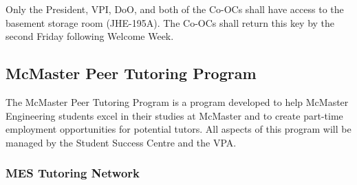 Only the President, VPI, DoO, and both of the Co-OCs shall have access to the basement storage room (JHE-195A). The Co-OCs shall return this key by the second Friday following Welcome Week.

\subsection{McMaster Peer Tutoring Program}
\label{mcmaster-peer-tutoring-program}

The McMaster Peer Tutoring Program is a program developed to help McMaster Engineering students excel in their studies at McMaster and to create part-time employment opportunities for potential tutors. All aspects of this program will be managed by the Student Success Centre and the VPA.

\subsubsection{MES Tutoring Network}
\label{mes-tutoring-network}

